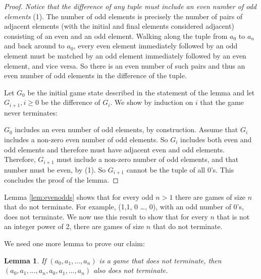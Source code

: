 \documentclass[12pt]{amsart}
\newtheorem{lemma}[theorem]{Lemma}
\begin{document}
\begin{proof}
\emph{Notice that the difference of any tuple must include an even number of odd elements} (1). The number of odd elements is precisely the number of pairs of adjacent elements (with the initial and final elements considered adjacent) consisting of an even and an odd element. Walking along the tuple from $a_0$ to $a_n$ and back around to $a_0$, every even element immediately followed by an odd element must be matched by an odd element immediately followed by an even element, and vice versa. So there is an even number of such pairs and thus an even number of odd elements in the difference of the tuple.

Let $G_0$ be the initial game state described in the statement of the lemma and let $G_{i+1}, i \geq 0$ be the difference of $G_i$. We show by induction on $i$ that the game never terminates:

$G_0$ includes an even number of odd elements, by construction. Assume that $G_i$ includes a non-zero even number of odd elements. So $G_i$ includes both even and odd elements and therefore must have adjacent even and odd elements. Therefore, $G_{i+1}$ must include a non-zero number of odd elements, and that number must be even, by (1). So $G_{i+1}$ cannot be the tuple of all $0$'s. This concludes the proof of the lemma.
\end{proof}

Lemma \ref{lem:evenodds} shows that for every odd $n > 1$ there are games of size $n$ that do not terminate. For example, (1,1, 0 \ldots, 0), with an odd number of 0's, does not terminate. We now use this result to show that for every $n$ that is not an integer power of 2, there are games of size $n$ that do not terminate.

We need one more lemma to prove our claim:

\begin{lemma}
\label{lem:doubles}
If $(a_0, a_1, \ldots, a_{n})$ is a game that does not terminate, then $(a_0, a_1, \ldots, a_n, a_0, a_1, \ldots, a_n)$ also does not terminate.
\end{lemma}
\end{document}
